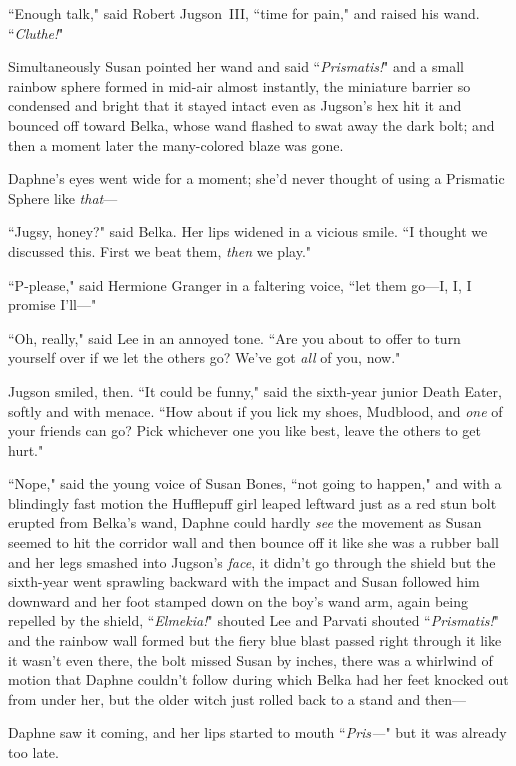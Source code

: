 ``Enough talk," said Robert Jugson~III, ``time for pain," and raised his wand. ``\emph{Cluthe!}"

Simultaneously Susan pointed her wand and said ``\emph{Prismatis!}" and a small rainbow sphere formed in mid-air almost instantly, the miniature barrier so condensed and bright that it stayed intact even as Jugson's hex hit it and bounced off toward Belka, whose wand flashed to swat away the dark bolt; and then a moment later the many-colored blaze was gone.

Daphne's eyes went wide for a moment; she'd never thought of using a Prismatic Sphere like \emph{that}—

``Jugsy, honey?" said Belka. Her lips widened in a vicious smile. ``I thought we discussed this. First we beat them, \emph{then} we play."

``P-please," said Hermione Granger in a faltering voice, ``let them go—I, I, I promise I'll—"

``Oh, really," said Lee in an annoyed tone. ``Are you about to offer to turn yourself over if we let the others go? We've got \emph{all} of you, now."

Jugson smiled, then. ``It could be funny," said the sixth-year junior Death Eater, softly and with menace. ``How about if you lick my shoes, Mudblood, and \emph{one} of your friends can go? Pick whichever one you like best, leave the others to get hurt."

``Nope," said the young voice of Susan Bones, ``not going to happen," and with a blindingly fast motion the Hufflepuff girl leaped leftward just as a red stun bolt erupted from Belka's wand, Daphne could hardly \emph{see} the movement as Susan seemed to hit the corridor wall and then bounce off it like she was a rubber ball and her legs smashed into Jugson's \emph{face}, it didn't go through the shield but the sixth-year went sprawling backward with the impact and Susan followed him downward and her foot stamped down on the boy's wand arm, again being repelled by the shield, ``\emph{Elmekia!}" shouted Lee and Parvati shouted ``\emph{Prismatis!}" and the rainbow wall formed but the fiery blue blast passed right through it like it wasn't even there, the bolt missed Susan by inches, there was a whirlwind of motion that Daphne couldn't follow during which Belka had her feet knocked out from under her, but the older witch just rolled back to a stand and then—

Daphne saw it coming, and her lips started to mouth ``\emph{Pris—}" but it was already too late.

